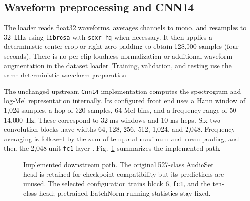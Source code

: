 \documentclass[conference]{IEEEtran}
\newcommand{\code}[1]{\texttt{#1}}
\begin{document}
\subsection{Waveform preprocessing and CNN14}
The loader reads float32 waveforms, averages channels to mono, and resamples to 32~kHz using \code{librosa} with \code{soxr\_hq} when necessary. It then applies a deterministic center crop or right zero-padding to obtain 128,000 samples (four seconds). There is no per-clip loudness normalization or additional waveform augmentation in the dataset loader. Training, validation, and testing use the same deterministic waveform preparation.

The unchanged upstream \code{Cnn14} implementation computes the spectrogram and log-Mel representation internally. Its configured front end uses a Hann window of 1,024 samples, a hop of 320 samples, 64 Mel bins, and a frequency range of 50--14,000~Hz. These correspond to 32-ms windows and 10-ms hops. Six two-convolution blocks have widths 64, 128, 256, 512, 1,024, and 2,048. Frequency averaging is followed by the sum of temporal maximum and mean pooling, and then the 2,048-unit \code{fc1} layer \cite{pannsrepo}. Fig.~\ref{fig:pipeline} summarizes the implemented path.

\begin{figure}[t]
\centering
{}
\caption{Implemented downstream path. The original 527-class AudioSet head is retained for checkpoint compatibility but its predictions are unused. The selected configuration trains block 6, \code{fc1}, and the ten-class head; pretrained BatchNorm running statistics stay fixed.}\label{fig:pipeline}
\end{figure}
\end{document}
